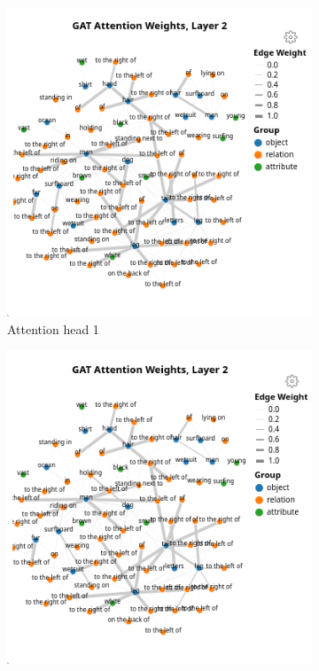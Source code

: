 \begin{figure}[htbp]
    \centering
    \begin{subfigure}[l]{0.49\textwidth}
        \includegraphics[width=\textwidth]{figures/positive_logical/positive_logical_gat_l2_h0.png}
        \caption{Attention head 1}
    \end{subfigure}
    \begin{subfigure}[r]{0.49\textwidth}
        \includegraphics[width=\textwidth]{figures/positive_logical/positive_logical_gat_l2_h1.png}

\end{subfigure}
\end{figure}
